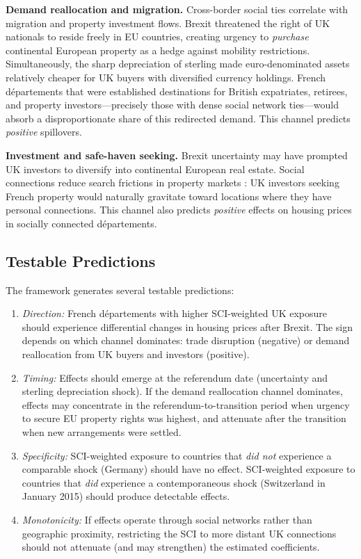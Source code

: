 \documentclass[12pt]{article}
\begin{document}
\textbf{Demand reallocation and migration.} Cross-border social ties correlate with migration and property investment flows. Brexit threatened the right of UK nationals to reside freely in EU countries, creating urgency to \textit{purchase} continental European property as a hedge against mobility restrictions. Simultaneously, the sharp depreciation of sterling made euro-denominated assets relatively cheaper for UK buyers with diversified currency holdings. French d\'epartements that were established destinations for British expatriates, retirees, and property investors---precisely those with dense social network ties---would absorb a disproportionate share of this redirected demand. This channel predicts \textit{positive} spillovers.

\textbf{Investment and safe-haven seeking.} Brexit uncertainty may have prompted UK investors to diversify into continental European real estate. Social connections reduce search frictions in property markets \citep{bailey2018house}: UK investors seeking French property would naturally gravitate toward locations where they have personal connections. This channel also predicts \textit{positive} effects on housing prices in socially connected d\'epartements.

\subsection{Testable Predictions}

The framework generates several testable predictions:

\begin{enumerate}
\item \textit{Direction:} French d\'epartements with higher SCI-weighted UK exposure should experience differential changes in housing prices after Brexit. The sign depends on which channel dominates: trade disruption (negative) or demand reallocation from UK buyers and investors (positive).
\item \textit{Timing:} Effects should emerge at the referendum date (uncertainty and sterling depreciation shock). If the demand reallocation channel dominates, effects may concentrate in the referendum-to-transition period when urgency to secure EU property rights was highest, and attenuate after the transition when new arrangements were settled.
\item \textit{Specificity:} SCI-weighted exposure to countries that \textit{did not} experience a comparable shock (Germany) should have no effect. SCI-weighted exposure to countries that \textit{did} experience a contemporaneous shock (Switzerland in January 2015) should produce detectable effects.
\item \textit{Monotonicity:} If effects operate through social networks rather than geographic proximity, restricting the SCI to more distant UK connections should not attenuate (and may strengthen) the estimated coefficients.
\end{enumerate}
\end{document}
